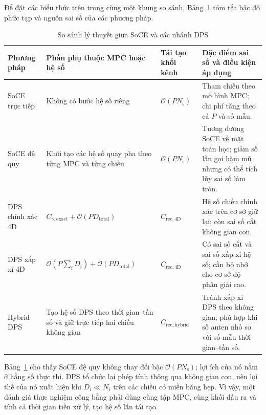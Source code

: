 Để đặt các biểu thức trên trong cùng một khung so sánh, Bảng~\ref{tab:ch2_complexity_comparison} tóm tắt bậc độ phức tạp và nguồn sai số của các phương pháp.

\begin{table}[H]
    \centering
    \small
    \caption{So sánh lý thuyết giữa SoCE và các nhánh DPS}
    \label{tab:ch2_complexity_comparison}
    \begin{tabularx}{\textwidth}{>{\raggedright\arraybackslash}p{} >{\raggedright\arraybackslash}p{} >{\raggedright\arraybackslash}p{} >{\raggedright\arraybackslash}X}
        \toprule
        Phương pháp & Phần phụ thuộc MPC hoặc hệ số & Tái tạo khối kênh & Đặc điểm sai số và điều kiện áp dụng \\
        \midrule
        SoCE trực tiếp
        & Không có bước hệ số riêng
        & \(\mathcal{O}(PN_{\mathrm{s}})\)
        & Tham chiếu theo mô hình MPC; chi phí tăng theo cả \(P\) và số mẫu. \\
        SoCE đệ quy
        & Khởi tạo các hệ số quay pha theo từng MPC và từng chiều
        & \(\mathcal{O}(PN_{\mathrm{s}})\)
        & Tương đương SoCE về mặt toán học; giảm số lần gọi hàm mũ nhưng có thể tích lũy sai số làm tròn. \\
        DPS chính xác 4D
        & \(C_{\gamma,\mathrm{exact}}+\mathcal{O}(PD_{\mathrm{total}})\)
        & \(C_{\mathrm{rec},\mathrm{4D}}\)
        & Hệ số chiếu chính xác trên cơ sở giữ lại; còn sai số cắt không gian con. \\
        DPS xấp xỉ 4D
        & \(\mathcal{O}(P\sum_iD_i)+\mathcal{O}(PD_{\mathrm{total}})\)
        & \(C_{\mathrm{rec},\mathrm{4D}}\)
        & Có sai số cắt và sai số xấp xỉ hệ số; cần bộ nhớ cho cơ sở độ phân giải cao. \\
        Hybrid DPS
        & Tạo hệ số DPS theo thời gian--tần số và giữ trực tiếp hai chiều không gian
        & \(C_{\mathrm{rec},\mathrm{hybrid}}\)
        & Tránh xấp xỉ DPS theo không gian; phù hợp khi số anten nhỏ so với số mẫu thời gian--tần số. \\
        \bottomrule
    \end{tabularx}
\end{table}

Bảng~\ref{tab:ch2_complexity_comparison} cho thấy SoCE đệ quy không thay đổi bậc \(\mathcal{O}(PN_{\mathrm{s}})\); lợi ích của nó nằm ở hằng số thực thi. DPS tổ chức lại phép tính thông qua không gian con, nên lợi thế của nó xuất hiện khi \(D_i\ll N_i\) trên các chiều có miền băng hẹp. Vì vậy, một đánh giá thực nghiệm công bằng phải dùng cùng tập MPC, cùng khối đầu ra và tính cả thời gian tiền xử lý, tạo hệ số lẫn tái tạo.

